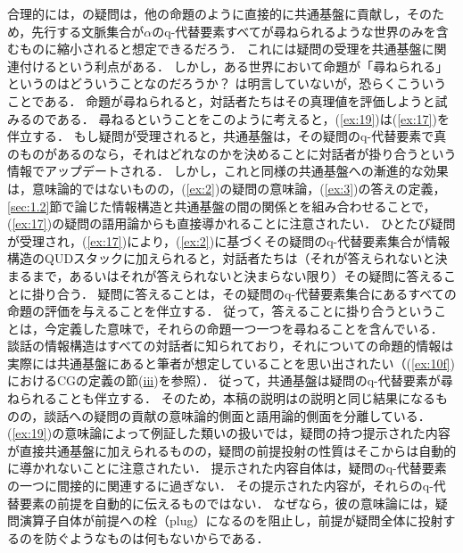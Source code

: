\documentclass{goken}
\begin{document}
\noindent
合理的には，\citeauthor{vonStechow1991}の疑問は，他の命題のように直接的に共通基盤に貢献し，そのため，先行する文脈集合が$\alpha$のq-代替要素すべてが尋ねられるような世界のみを含むものに縮小されると想定できるだろう．
これには疑問の受理を共通基盤に関連付けるという利点がある．
しかし，ある世界において命題が「尋ねられる」というのはどういうことなのだろうか？
\citeauthor{vonStechow1991}は明言していないが，恐らくこういうことである．
命題が尋ねられると，対話者たちはその真理値を評価しようと試みるのである．
尋ねるということをこのように考えると，(\ref{ex:19})は(\ref{ex:17})を伴立する．
もし疑問が受理されると，共通基盤は，その疑問のq-代替要素で真のものがあるのなら，それはどれなのかを決めることに対話者が掛り合うという情報でアップデートされる．
しかし，これと同様の共通基盤への漸進的な効果は，意味論的ではないものの，(\ref{ex:2})の疑問の意味論，(\ref{ex:3})の答えの定義，\ref{sec:1.2}節で論じた情報構造と共通基盤の間の関係とを組み合わせることで，(\ref{ex:17})の疑問の語用論からも直接導かれることに注意されたい．
ひとたび疑問が受理され，(\ref{ex:17})により，(\ref{ex:2})に基づくその疑問のq-代替要素集合が情報構造のQUDスタックに加えられると，対話者たちは（それが答えられないと決まるまで，あるいはそれが答えられないと決まらない限り）その疑問に答えることに掛り合う．
疑問に答えることは，その疑問のq-代替要素集合にあるすべての命題の評価を与えることを伴立する．
従って，答えることに掛り合うということは，今定義した意味で，それらの命題一つ一つを尋ねることを含んでいる．
談話の情報構造はすべての対話者に知られており，それについての命題的情報は実際には共通基盤にあると筆者が想定していることを思い出されたい（(\ref{ex:10f})におけるCGの定義の節(\hyperref[ex:10giii]{iii})を参照）．
従って，共通基盤は疑問のq-代替要素が尋ねられることも伴立する．
そのため，本稿の説明は\citeauthor{vonStechow1991}の説明と同じ結果になるものの，談話への疑問の貢献の意味論的側面と語用論的側面を分離している．
(\ref{ex:19})の意味論によって例証した類いの扱いでは，疑問の持つ提示された内容が直接共通基盤に加えられるものの，疑問の前提投射の性質はそこからは自動的に導かれないことに注意されたい．
提示された内容自体は，疑問のq-代替要素の一つに間接的に関連するに過ぎない．
その提示された内容が，それらのq-代替要素の前提を自動的に伝えるものではない．
なぜなら，彼の意味論には，疑問演算子自体が前提への栓（plug）になるのを阻止し，前提が疑問全体に投射するのを防ぐようなものは何もないからである．
\end{document}
